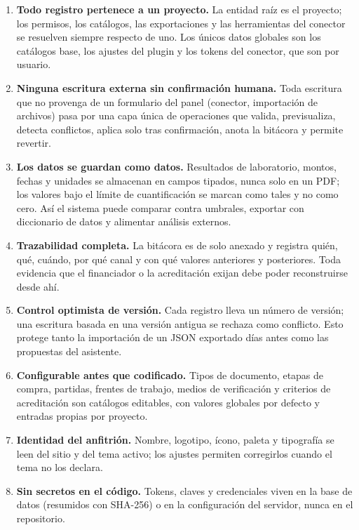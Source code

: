 \documentclass[11pt,a4paper]{article}
\begin{document}
\begin{enumerate}
\item \textbf{Todo registro pertenece a un proyecto.} La entidad raíz es el proyecto; los permisos, los catálogos, las exportaciones y las herramientas del conector se resuelven siempre respecto de uno. Los únicos datos globales son los catálogos base, los ajustes del plugin y los tokens del conector, que son por usuario.
\item \textbf{Ninguna escritura externa sin confirmación humana.} Toda escritura que no provenga de un formulario del panel (conector, importación de archivos) pasa por una capa única de operaciones que valida, previsualiza, detecta conflictos, aplica solo tras confirmación, anota la bitácora y permite revertir.
\item \textbf{Los datos se guardan como datos.} Resultados de laboratorio, montos, fechas y unidades se almacenan en campos tipados, nunca solo en un PDF; los valores bajo el límite de cuantificación se marcan como tales y no como cero. Así el sistema puede comparar contra umbrales, exportar con diccionario de datos y alimentar análisis externos.
\item \textbf{Trazabilidad completa.} La bitácora es de solo anexado y registra quién, qué, cuándo, por qué canal y con qué valores anteriores y posteriores. Toda evidencia que el financiador o la acreditación exijan debe poder reconstruirse desde ahí.
\item \textbf{Control optimista de versión.} Cada registro lleva un número de versión; una escritura basada en una versión antigua se rechaza como conflicto. Esto protege tanto la importación de un JSON exportado días antes como las propuestas del asistente.
\item \textbf{Configurable antes que codificado.} Tipos de documento, etapas de compra, partidas, frentes de trabajo, medios de verificación y criterios de acreditación son catálogos editables, con valores globales por defecto y entradas propias por proyecto.
\item \textbf{Identidad del anfitrión.} Nombre, logotipo, ícono, paleta y tipografía se leen del sitio y del tema activo; los ajustes permiten corregirlos cuando el tema no los declara.
\item \textbf{Sin secretos en el código.} Tokens, claves y credenciales viven en la base de datos (resumidos con SHA-256) o en la configuración del servidor, nunca en el repositorio.
\end{enumerate}
\end{document}
